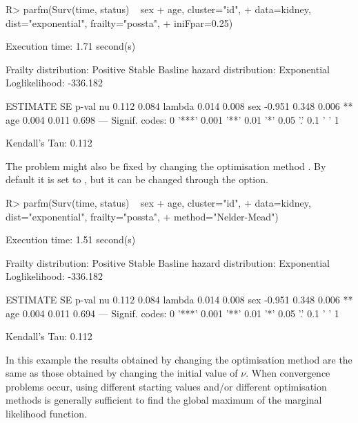 \begin{CodeChunk}
\begin{CodeInput}
R> parfm(Surv(time, status) ~ sex + age, cluster="id", 
+        data=kidney, dist="exponential", frailty="possta", 
+        iniFpar=0.25)
\end{CodeInput}
\begin{CodeOutput}
Execution time: 1.71 second(s)

Frailty distribution: Positive Stable 
Basline hazard distribution: Exponential 
Loglikelihood: -336.182 

       ESTIMATE SE    p-val    
nu      0.112   0.084          
lambda  0.014   0.008          
sex    -0.951   0.348 0.006 ** 
age     0.004   0.011 0.698    
---
Signif. codes: 0 '***' 0.001 '**' 0.01 '*' 0.05 '.' 0.1 ' ' 1

Kendall's Tau: 0.112 
\end{CodeOutput}
\end{CodeChunk}

The problem might also be fixed by changing the optimisation method
    \cite[see ;][]{R:optimx}.
By default it is set to , 
  but it can be changed through the  option.

\begin{CodeChunk}
\begin{CodeInput}
R> parfm(Surv(time, status) ~ sex + age, cluster="id", 
+        data=kidney, dist="exponential", frailty="possta", 
+        method="Nelder-Mead")
\end{CodeInput}
\begin{CodeOutput}
Execution time: 1.51 second(s)

Frailty distribution: Positive Stable 
Basline hazard distribution: Exponential 
Loglikelihood: -336.182 

       ESTIMATE SE    p-val    
nu      0.112   0.084          
lambda  0.014   0.008          
sex    -0.951   0.348 0.006 ** 
age     0.004   0.011 0.694    
---
Signif. codes: 0 '***' 0.001 '**' 0.01 '*' 0.05 '.' 0.1 ' ' 1

Kendall's Tau: 0.112 
\end{CodeOutput}
\end{CodeChunk}

In this example the results obtained by changing the optimisation method are the same
  as those obtained by changing the initial value of $\nu$.
When convergence problems occur, using different starting values and/or different optimisation methods
  is generally sufficient to find the global maximum of the marginal likelihood function.


